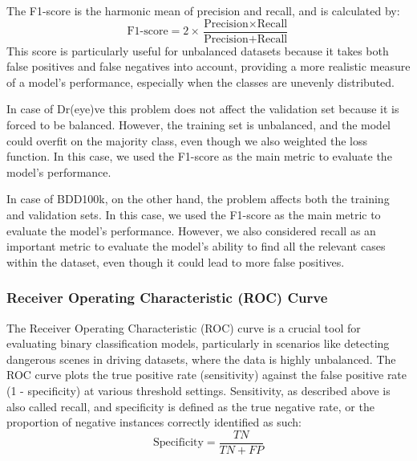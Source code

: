 The F1-score is the harmonic mean of precision and recall, and is calculated by:
\begin{equation*}
    \text{F1-score} = 2 \times \frac{\text{Precision} \times \text{Recall}}{\text{Precision} + \text{Recall}}
\end{equation*}
This score is particularly useful for unbalanced datasets because it takes both 
false positives and false negatives into account, providing a more realistic 
measure of a model’s performance, especially when the classes are unevenly 
distributed.

In case of Dr(eye)ve this problem does not affect the validation set because it 
is forced to be balanced. However, the training set is unbalanced, and the model 
could overfit on the majority class, even though we also weighted the loss 
function. In this case, we used the F1-score as the main metric to evaluate the 
model's performance.

In case of BDD100k, on the other hand, the problem affects both the training 
and validation sets. In this case, we used the F1-score as the main metric to 
evaluate the model's performance. However, we also considered recall as an 
important metric to evaluate the model's ability to find all the relevant cases 
within the dataset, even though it could lead to more false positives.

\subsubsection{Receiver Operating Characteristic (ROC) Curve}
The Receiver Operating Characteristic (ROC) curve is a crucial tool for 
evaluating binary classification models, particularly in scenarios like detecting 
dangerous scenes in driving datasets, where the data is highly unbalanced. 
The ROC curve plots the true positive rate (sensitivity) against the false positive 
rate (1 - specificity) at various threshold settings. 
Sensitivity, as described above is also called recall, and specificity is 
defined as the true negative rate, or the proportion of negative instances 
correctly identified as such:
\begin{equation*}
    \text{Specificity} = \frac{TN}{TN + FP}
\end{equation*}


